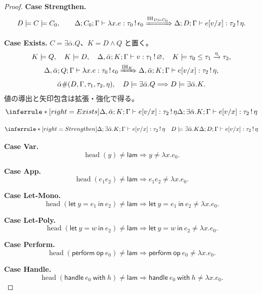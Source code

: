 \documentclass[a4paper,11pt]{article}
\theoremstyle{definition}
\newenvironment{Case}[1]{\par\smallskip\noindent\textbf{Case #1.}\enspace\ignorespaces}{\par}
\newcommand{\op}{\mathsf{op}}
\newcommand{\emp}{\varnothing}
\newcommand{\arr}[3]{#1\xrightarrow{#2}#3}
\newcommand{\jj}[6]{#1;#2;#3\vdash #4:#5\,!\,#6}
\newcommand{\lete}[3]{\mathsf{let}\ #1=#2\ \mathsf{in}\ #3}
\newcommand{\perform}[2]{\mathsf{perform}\ #1\ #2}
\newcommand{\handle}[2]{\mathsf{handle}\ #1\ \mathsf{with}\ #2}
\begin{document}
\begin{proof}
\begin{Case}{Strengthen}
\[
 D\models C\models C_0,\qquad
 \jj\Delta{C_0}\Gamma{\lambda x.e}{\tau_0}{\epsilon_0}
 \xRightarrow{\mathrm{IH}_{D\models C_0}}\jj\Delta D\Gamma{e[v/x]}{\tau_2}\eta.
\]
\end{Case}

\begin{Case}{Exists}
$C=\exists\bar\alpha.Q$、$K=D\land Q$ と置く。
\begin{gather*}
 K\models Q,\quad K\models D,\quad
 \jj{\Delta,\bar\alpha}K\Gamma v{\tau_1}\emp,\quad
 K\models\tau_0\leq\arr{\tau_1}\eta{\tau_2},\\
 \jj{\Delta,\bar\alpha}Q\Gamma{\lambda x.e}{\tau_0}{\epsilon_0}
 \xRightarrow{\mathrm{IH}_K}\jj{\Delta,\bar\alpha}K\Gamma{e[v/x]}{\tau_2}\eta,\\
 \bar\alpha\#(D,\Gamma,\tau_1,\tau_2,\eta),\quad
 D\models\exists\bar\alpha.Q\Longrightarrow D\models\exists\bar\alpha.K.
\end{gather*}
値の導出と矢印包含は拡張・強化で得る。
\[
\inferrule*[right=Exists]{\jj{\Delta,\bar\alpha}{K}{\Gamma}{e[v/x]}{\tau_2}{\eta}}{\jj{\Delta}{\exists\bar\alpha.K}{\Gamma}{e[v/x]}{\tau_2}{\eta}}
\]

\[
\inferrule*[right=Strengthen]{\jj{\Delta}{\exists\bar\alpha.K}{\Gamma}{e[v/x]}{\tau_2}{\eta}\quad D\models\exists\bar\alpha.K}{\jj{\Delta}{D}{\Gamma}{e[v/x]}{\tau_2}{\eta}}
\]
\end{Case}

\begin{Case}{Var}
\[\operatorname{head}(y)\ne\mathsf{lam}\Longrightarrow y\ne\lambda x.e_0.\]
\end{Case}

\begin{Case}{App}
\[\operatorname{head}(e_1e_2)\ne\mathsf{lam}\Longrightarrow e_1e_2\ne\lambda x.e_0.\]
\end{Case}

\begin{Case}{Let-Mono}
\[\operatorname{head}(\lete y{e_1}{e_2})\ne\mathsf{lam}\Longrightarrow \lete y{e_1}{e_2}\ne\lambda x.e_0.\]
\end{Case}

\begin{Case}{Let-Poly}
\[\operatorname{head}(\lete y w{e_2})\ne\mathsf{lam}\Longrightarrow \lete y w{e_2}\ne\lambda x.e_0.\]
\end{Case}

\begin{Case}{Perform}
\[\operatorname{head}(\perform\op{e_0})\ne\mathsf{lam}\Longrightarrow \perform\op{e_0}\ne\lambda x.e_0.\]
\end{Case}

\begin{Case}{Handle}
\[\operatorname{head}(\handle{e_0}h)\ne\mathsf{lam}\Longrightarrow \handle{e_0}h\ne\lambda x.e_0.\]
\end{Case}
\end{proof}
\end{document}
